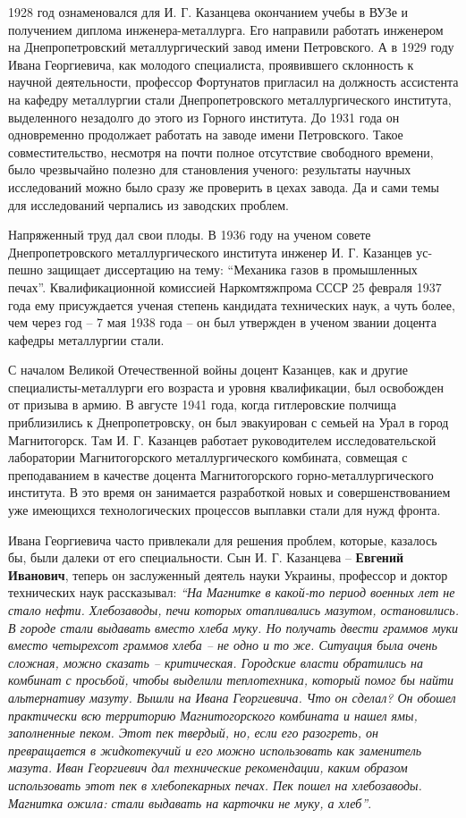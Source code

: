 1928 год ознаменовался для И. Г. Казанцева окончанием учебы в ВУЗе и получением
диплома инженера-металлурга. Его направили работать инженером на
Днепропетровский металлургический завод имени Петровского. А в 1929 году Ивана
Георгиевича, как молодого специалиста, проявившего склонность к научной
деятельности, профессор Фортунатов пригласил на должность ассистента на кафедру
металлургии стали Днепропетровского металлургического института, выделенного
незадолго до этого из Горного института. До 1931 года он одновременно
продолжает работать на заводе имени Петровского. Такое совместительство,
несмотря на почти полное отсутствие свободного времени, было чрезвычайно
полезно для становления ученого: результаты научных исследований можно было
сразу же проверить в цехах завода. Да и сами темы для исследований черпались из
заводских проблем.

Напряженный труд дал свои плоды. В 1936 году на ученом совете
Днепропетровского металлургического института инженер И. Г. Казанцев ус\hyp{}пешно
защищает диссертацию на тему: \enquote{Механика газов в промышленных печах}.
Квалификационной комиссией Наркомтяжпрома СССР 25 февраля 1937 года ему
присуждается ученая степень кандидата технических наук, а чуть более, чем
через год – 7 мая 1938 года – он был утвержден в ученом звании доцента кафедры
металлургии стали.

С началом Великой Отечественной войны доцент Казанцев, как и другие
специалисты-металлурги его возраста и уровня квалификации, был освобожден от
призыва в армию. В августе 1941 года, когда гитлеровские полчища приблизились к
Днепропетровску, он был эвакуирован с семьей на Урал в город Магнитогорск. Там
И. Г. Казанцев работает руководителем исследовательской лаборатории
Магнитогорского металлургического комбината, совмещая с преподаванием в
качестве доцента Магнитогорского горно-металлургического института. В это время
он занимается разработкой новых и совершенствованием уже имеющихся
технологических процессов выплавки стали для нужд фронта.

Ивана Георгиевича часто привлекали для решения проблем, которые, казалось бы,
были далеки от его специальности. Сын И. Г. Казанцева – \textbf{Евгений Иванович}, теперь
он заслуженный деятель науки Украины, профессор и доктор технических наук
рассказывал: \emph{\enquote{На Магнитке в какой-то период военных лет не стало нефти.
Хлебозаводы, печи которых отапливались мазутом, остановились. В городе стали
выдавать вместо хлеба муку. Но получать двести граммов муки вместо четырехсот
граммов хлеба – не одно и то же. Ситуация была очень сложная, можно сказать –
критическая. Городские власти обратились на комбинат с просьбой, чтобы выделили
теплотехника, который помог бы найти альтернативу мазуту. Вышли на Ивана
Георгиевича. Что он сделал? Он обошел практически всю территорию
Магнитогорского комбината и нашел ямы, заполненные пеком. Этот пек твердый, но,
если его разогреть, он превращается в жидкотекучий и его можно использовать как
заменитель мазута. Иван Георгиевич дал технические рекомендации, каким образом
использовать этот пек в хлебопекарных печах. Пек пошел на хлебозаводы. Магнитка
ожила: стали выдавать на карточки не муку, а хлеб}}.

